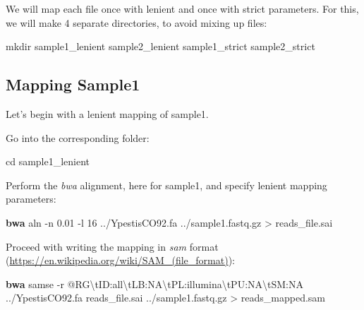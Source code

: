 \documentclass[
  letterpaper,
]{book}
\newenvironment{Shaded}{}{}
\newcommand{\AttributeTok}[1]{\textcolor[rgb]{0.84,0.23,0.29}{#1}}
\newcommand{\BuiltInTok}[1]{\textcolor[rgb]{0.84,0.23,0.29}{#1}}
\newcommand{\ExtensionTok}[1]{\textcolor[rgb]{0.84,0.23,0.29}{\textbf{#1}}}
\newcommand{\FunctionTok}[1]{\textcolor[rgb]{0.44,0.26,0.76}{#1}}
\newcommand{\NormalTok}[1]{\textcolor[rgb]{0.14,0.16,0.18}{#1}}
\newcommand{\OperatorTok}[1]{\textcolor[rgb]{0.14,0.16,0.18}{#1}}
\newcommand{\StringTok}[1]{\textcolor[rgb]{0.01,0.18,0.38}{#1}}
\begin{document}
We will map each file once with lenient and once with strict parameters.
For this, we will make 4 separate directories, to avoid mixing up files:

\begin{Shaded}
\begin{Highlighting}[]
\FunctionTok{mkdir}\NormalTok{ sample1\_lenient sample2\_lenient sample1\_strict sample2\_strict}
\end{Highlighting}
\end{Shaded}

\hypertarget{mapping-sample1}{%
\subsection{Mapping Sample1}\label{mapping-sample1}}

Let's begin with a lenient mapping of sample1.

Go into the corresponding folder:

\begin{Shaded}
\begin{Highlighting}[]
\BuiltInTok{cd}\NormalTok{ sample1\_lenient}
\end{Highlighting}
\end{Shaded}

Perform the \emph{bwa} alignment, here for sample1, and specify lenient
mapping parameters:

\begin{Shaded}
\begin{Highlighting}[]
\ExtensionTok{bwa}\NormalTok{ aln }\AttributeTok{{-}n}\NormalTok{ 0.01 }\AttributeTok{{-}l}\NormalTok{ 16 ../YpestisCO92.fa ../sample1.fastq.gz }\OperatorTok{\textgreater{}}\NormalTok{ reads\_file.sai}
\end{Highlighting}
\end{Shaded}

Proceed with writing the mapping in \emph{sam} format
(\url{https://en.wikipedia.org/wiki/SAM_(file_format)}):

\begin{Shaded}
\begin{Highlighting}[]
\ExtensionTok{bwa}\NormalTok{ samse }\AttributeTok{{-}r} \StringTok{\textquotesingle{}@RG\textbackslash{}tID:all\textbackslash{}tLB:NA\textbackslash{}tPL:illumina\textbackslash{}tPU:NA\textbackslash{}tSM:NA\textquotesingle{}}\NormalTok{ ../YpestisCO92.fa reads\_file.sai ../sample1.fastq.gz }\OperatorTok{\textgreater{}}\NormalTok{ reads\_mapped.sam}
\end{Highlighting}
\end{Shaded}
\end{document}
